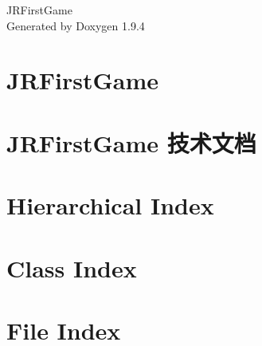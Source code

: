 \documentclass[twoside]{book}
\newcommand{\+}{\discretionary{\mbox{\scriptsize$\hookleftarrow$}}{}{}}
\newcommand{\clearemptydoublepage}{%
    \newpage{\pagestyle{empty}\cleardoublepage}%
  }
\begin{document}
  \raggedbottom
    \hypersetup{pageanchor=false,
                bookmarksnumbered=true,
                pdfencoding=unicode
               }
  \begin{titlepage}
  \vspace*{7cm}
  \begin{center}%
  {\Large JRFirst\+Game}\\
  \vspace*{1cm}
  {\large Generated by Doxygen 1.9.4}\\
  \end{center}
  \end{titlepage}
  \clearemptydoublepage
  \tableofcontents
  \clearemptydoublepage
  \hypersetup{pageanchor=true}
\chapter{JRFirst\+Game}
\label{md_README}

\chapter{JRFirst\+Game 技术文档}
\label{md_document}

\chapter{Hierarchical Index}

\chapter{Class Index}

\chapter{File Index}

\end{document}
